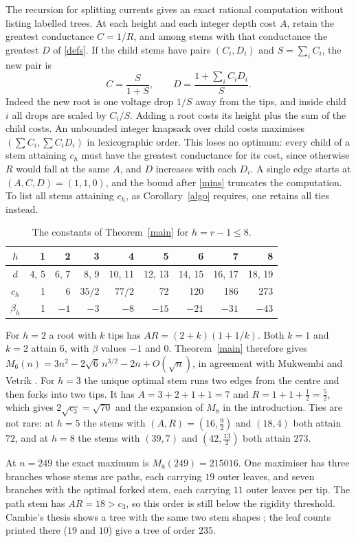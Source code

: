 \documentclass[11pt,a4paper]{article}
\theoremstyle{remark}
\begin{document}
The recursion for splitting currents gives an exact rational computation without listing labelled trees. At each height and each integer depth cost $A$, retain the greatest conductance $C=1/R$, and among stems with that conductance the greatest $D$ of \eqref{defs}. If the child stems have pairs $(C_i,D_i)$ and $S=\sum_iC_i$, the new pair is
\[
 C=\frac{S}{1+S},\qquad D=\frac{1+\sum_i C_iD_i}{S}.
\]
Indeed the new root is one voltage drop $1/S$ away from the tips, and inside child $i$ all drops are scaled by $C_i/S$. Adding a root costs its height plus the sum of the child costs. An unbounded integer knapsack over child costs maximises $(\sum C_i,\sum C_iD_i)$ in lexicographic order. This loses no optimum: every child of a stem attaining $c_h$ must have the greatest conductance for its cost, since otherwise $R$ would fall at the same $A$, and $D$ increases with each $D_i$. A single edge starts at $(A,C,D)=(1,1,0)$, and the bound after \eqref{mins} truncates the computation. To list all stems attaining $c_h$, as Corollary~\ref{algo} requires, one retains all ties instead.

\begin{table}[tb]
\centering
\begin{tabular}{crrrrrrrr}
\toprule
$h$ & 1&2&3&4&5&6&7&8\\
\midrule
$d$ & 4, 5&6, 7&8, 9&10, 11&12, 13&14, 15&16, 17&18, 19\\
$c_h$ & 1&6&$35/2$&$77/2$&72&120&186&273\\
$\beta_h$ & 1&$-1$&$-3$&$-8$&$-15$&$-21$&$-31$&$-43$\\
\bottomrule
\end{tabular}
\caption{The constants of Theorem~\ref{main} for $h=r-1\le8$.}\label{tab:constants}
\end{table}

For $h=2$ a root with $k$ tips has $AR=(2+k)(1+1/k)$. Both $k=1$ and $k=2$ attain $6$, with $\beta$ values $-1$ and $0$. Theorem~\ref{main} therefore gives $M_6(n)=3n^2-2\sqrt6\,n^{3/2}-2n+O(\sqrt n)$, in agreement with Mukwembi and Vetrík \cite[Thm~3.4]{mv}. For $h=3$ the unique optimal stem runs two edges from the centre and then forks into two tips. It has $A=3+2+1+1=7$ and $R=1+1+\frac12=\frac52$, which gives $2\sqrt{c_3}=\sqrt{70}$ and the expansion of $M_8$ in the introduction. Ties are not rare: at $h=5$ the stems with $(A,R)=(16,\frac92)$ and $(18,4)$ both attain $72$, and at $h=8$ the stems with $(39,7)$ and $(42,\frac{13}2)$ both attain $273$.

At $n=249$ the exact maximum is $M_8(249)=215016$. One maximiser has three branches whose stems are paths, each carrying $19$ outer leaves, and seven branches with the optimal forked stem, each carrying $11$ outer leaves per tip. The path stem has $AR=18>c_3$, so this order is still below the rigidity threshold. Cambie's thesis shows a tree with the same two stem shapes \cite[Samenvatting, Fig.~12.17]{thesis}; the leaf counts printed there ($19$ and $10$) give a tree of order $235$.
\end{document}
